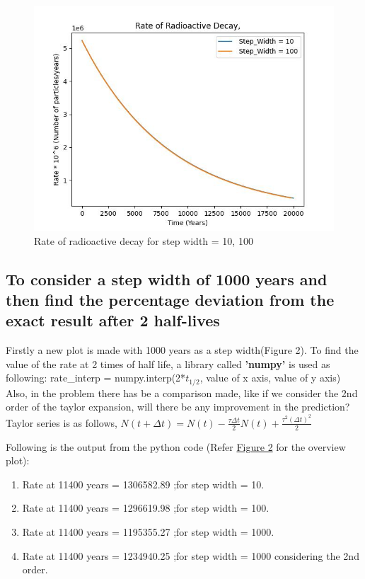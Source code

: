 \documentclass[11pt]{article}
\begin{document}
\begin{figure}[b]
    \centering
    \includegraphics[width=\textwidth, height=\textheight, keepaspectratio]{Carbon_plot_10_100.jpeg}
    \caption{Rate of radioactive decay for step width = 10, 100}
    \label{fig:Rate of radioactive decay for step width = 10, 100}
\end{figure}

\subsection{To consider a step width of 1000 years and then find the percentage deviation from the exact result after 2 half-lives}

Firstly a new plot is made with 1000 years as a step width(Figure 2).
To find the value of the rate at 2 times of half life, a library called \textbf{'numpy'} is used as following: rate\_interp = numpy.interp(2*$t_{1/2}$, value of x axis, value of y axis)
Also, in the problem there has be a comparison made, like if we consider the 2nd order of the taylor expansion, will there be any improvement in the prediction?
Taylor series is as follows,
$N(t+\Delta t) = N(t) - \frac{\tau \Delta t}{2} N(t) + \frac{\tau^2 (\Delta t)^2}{2}$

Following is the output from the python code (Refer \hyperref[fig:Rate of radioactive decay for step width = 10, 100, 1000]{Figure 2} for the overview plot):
\begin{enumerate}
    \item Rate at 11400 years = 1306582.89 ;for step width = 10.
    \item Rate at 11400 years = 1296619.98 ;for step width = 100.
    \item Rate at 11400 years = 1195355.27 ;for step width = 1000.
    \item Rate at 11400 years = 1234940.25 ;for step width = 1000 considering the 2nd order.
\end{enumerate}
\end{document}
